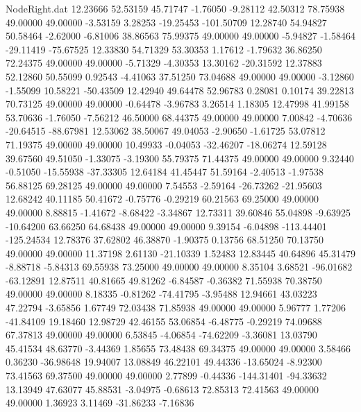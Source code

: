 \begin{filecontents}{NodeRight.dat}
  12.23666   52.53159   45.71747    -1.76050   -9.28112   42.50312   78.75938   49.00000   49.00000   -3.53159    3.28253  -19.25453 -101.50709
  12.28740   54.94827   50.58464    -2.62000   -6.81006   38.86563   75.99375   49.00000   49.00000   -5.94827   -1.58464  -29.11419  -75.67525
  12.33830   54.71329   53.30353     1.17612   -1.79632   36.86250   72.24375   49.00000   49.00000   -5.71329   -4.30353   13.30162  -20.31592
  12.37883   52.12860   50.55099     0.92543   -4.41063   37.51250   73.04688   49.00000   49.00000   -3.12860   -1.55099   10.58221  -50.43509
  12.42940   49.64478   52.96783     0.28081    0.10174   39.22813   70.73125   49.00000   49.00000   -0.64478   -3.96783    3.26514    1.18305
  12.47998   41.99158   53.70636    -1.76050   -7.56212   46.50000   68.44375   49.00000   49.00000    7.00842   -4.70636  -20.64515  -88.67981
  12.53062   38.50067   49.04053    -2.90650   -1.61725   53.07812   71.19375   49.00000   49.00000   10.49933   -0.04053  -32.46207  -18.06274
  12.59128   39.67560   49.51050    -1.33075   -3.19300   55.79375   71.44375   49.00000   49.00000    9.32440   -0.51050  -15.55938  -37.33305
  12.64184   41.45447   51.59164    -2.40513   -1.97538   56.88125   69.28125   49.00000   49.00000    7.54553   -2.59164  -26.73262  -21.95603
  12.68242   40.11185   50.41672    -0.75776   -0.29219   60.21563   69.25000   49.00000   49.00000    8.88815   -1.41672   -8.68422   -3.34867
  12.73311   39.60846   55.04898    -9.63925  -10.64200   63.66250   64.68438   49.00000   49.00000    9.39154   -6.04898 -113.44401 -125.24534
  12.78376   37.62802   46.38870    -1.90375    0.13756   68.51250   70.13750   49.00000   49.00000   11.37198    2.61130  -21.10339    1.52483
  12.83445   40.64896   45.31479    -8.88718   -5.84313   69.55938   73.25000   49.00000   49.00000    8.35104    3.68521  -96.01682  -63.12891
  12.87511   40.81665   49.81262    -6.84587   -0.36382   71.55938   70.38750   49.00000   49.00000    8.18335   -0.81262  -74.41795   -3.95488
  12.94661   43.03223   47.22794    -3.65856    1.67749   72.03438   71.85938   49.00000   49.00000    5.96777    1.77206  -41.84109   19.18460
  12.98729   42.46155   53.06854    -6.48775   -0.29219   74.09688   67.37813   49.00000   49.00000    6.53845   -4.06854  -74.62209   -3.36081
  13.03790   45.41534   48.63770    -3.44369    1.85655   73.48438   69.34375   49.00000   49.00000    3.58466    0.36230  -36.98648   19.94007
  13.08849   46.22101   49.44336   -13.65024   -8.92300   73.41563   69.37500   49.00000   49.00000    2.77899   -0.44336 -144.31401  -94.33632
  13.13949   47.63077   45.88531    -3.04975   -0.68613   72.85313   72.41563   49.00000   49.00000    1.36923    3.11469  -31.86233   -7.16836

\end{filecontents}
